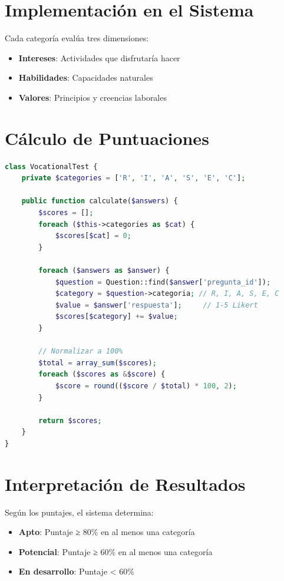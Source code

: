 \documentclass[12pt, a4paper]{report}
\begin{document}
\section{Implementación en el Sistema}
Cada categoría evalúa tres dimensiones:
\begin{itemize}
    \item \textbf{Intereses}: Actividades que disfrutaría hacer
    \item \textbf{Habilidades}: Capacidades naturales
    \item \textbf{Valores}: Principios y creencias laborales
\end{itemize}

\section{Cálculo de Puntuaciones}
\begin{lstlisting}[language=PHP, caption=Algoritmo de cálculo RIASEC]
class VocationalTest {
    private $categories = ['R', 'I', 'A', 'S', 'E', 'C'];
    
    public function calculate($answers) {
        $scores = [];
        foreach ($this->categories as $cat) {
            $scores[$cat] = 0;
        }
        
        foreach ($answers as $answer) {
            $question = Question::find($answer['pregunta_id']);
            $category = $question->categoria; // R, I, A, S, E, C
            $value = $answer['respuesta'];     // 1-5 Likert
            $scores[$category] += $value;
        }
        
        // Normalizar a 100%
        $total = array_sum($scores);
        foreach ($scores as &$score) {
            $score = round(($score / $total) * 100, 2);
        }
        
        return $scores;
    }
}
\end{lstlisting}

\section{Interpretación de Resultados}
Según los puntajes, el sistema determina:
\begin{itemize}
    \item \textbf{Apto}: Puntaje ≥ 80\% en al menos una categoría
    \item \textbf{Potencial}: Puntaje ≥ 60\% en al menos una categoría
    \item \textbf{En desarrollo}: Puntaje < 60\%
\end{itemize}
\end{document}
